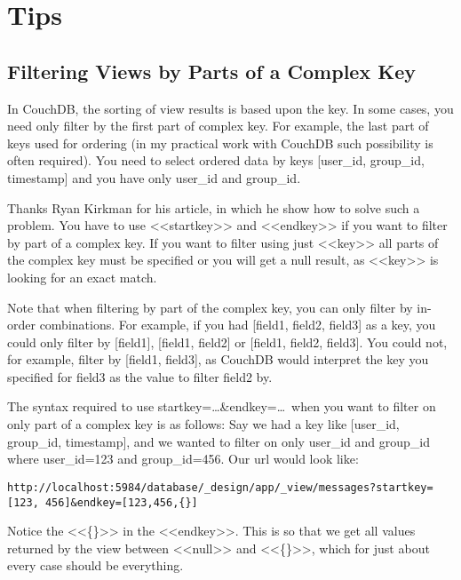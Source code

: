 \section{Tips}

\subsection{Filtering Views by Parts of a Complex Key}

In CouchDB, the sorting of view results is based upon the key. In some cases, you need only filter by the first part of complex key. For example, the last part of keys used for ordering (in my practical work with CouchDB such possibility is often required). You need to select ordered data by keys [user\_id, group\_id, timestamp] and you have only user\_id and group\_id.

Thanks Ryan Kirkman for his article\cite{couchdb_filtering_views}, in which he show how to solve such a problem. You have to use <<startkey>> and <<endkey>> if you want to filter by part of a complex key. If you want to filter using just <<key>> all parts of the complex key must be specified or you will get a null result, as <<key>> is looking for an exact match.

Note that when filtering by part of the complex key, you can only filter by in-order combinations. For example, if you had [field1, field2, field3] as a key, you could only filter by [field1], [field1, field2] or [field1, field2, field3]. You could not, for example, filter by [field1, field3], as CouchDB would interpret the key you specified for field3 as the value to filter field2 by.

The syntax required to use startkey=\dots\&endkey=\dots~when you want to filter on only part of a complex key is as follows:
Say we had a key like [user\_id, group\_id, timestamp], and we wanted to filter on only user\_id and group\_id where user\_id=123 and group\_id=456. Our url would look like:

\begin{lstlisting}[label=lst:couchdb1,caption=Filtering Views by Parts of a Complex Key]
http://localhost:5984/database/_design/app/_view/messages?startkey=[123, 456]&endkey=[123,456,{}]
\end{lstlisting}

Notice the <<\{\}>> in the <<endkey>>. This is so that we get all values returned by the view between <<null>> and <<\{\}>>, which for just about every case should be everything.

